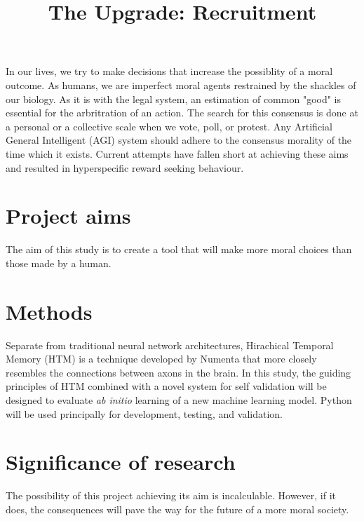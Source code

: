 \documentclass[12pt]{article}
\title{The Upgrade: Recruitment}
\date{\vspace{-5ex}}
\author{\vspace{-5ex}}
\begin{document}
\maketitle

In our lives, we try to make decisions that increase the possiblity of a moral outcome. As humans, we are imperfect moral agents restrained by the shackles of our biology.  As it is with the legal system, an estimation of common "good" is essential for the arbritration of an action. The search for this consensus is done at a personal or a collective scale when we vote, poll, or protest. Any Artificial General Intelligent (AGI) system should adhere to the consensus morality of the time which it exists. Current attempts have fallen short at achieving these aims and resulted in hyperspecific reward seeking behaviour.

\section*{Project aims}
The aim of this study is to create a tool that will make more moral choices than those made by a human. 

\section*{Methods}
Separate from traditional neural network architectures, Hirachical Temporal Memory (HTM) is a technique developed by Numenta that more closely resembles the connections between axons in the brain. In this study, the guiding principles of HTM combined with a novel system for self validation will be designed to evaluate \emph{ab initio} learning of a new machine learning model. Python will be used principally for development, testing, and validation.

\section*{Significance of research}
The possibility of this project achieving its aim is incalculable. However, if it does, the consequences will pave the way for the future of a more moral society.
\end{document}
